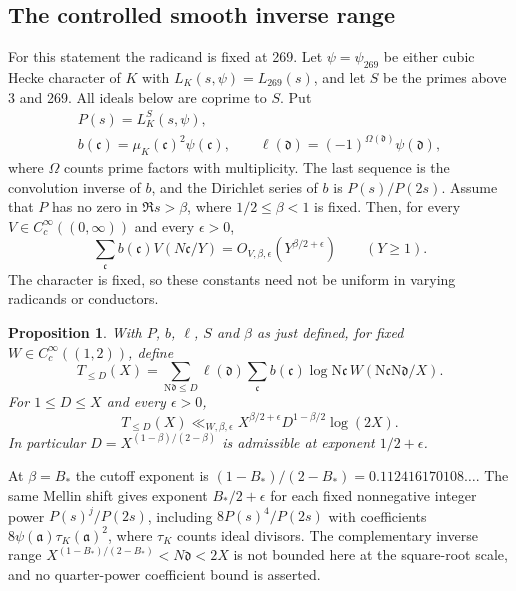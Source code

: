 \documentclass[11pt]{article}
\newtheorem{proposition}[theorem]{Proposition}
\newcommand{\N}{\mathrm N}
\begin{document}
\subsection*{The controlled smooth inverse range}
For this statement the radicand is fixed at 269. Let
$\psi=\psi_{269}$ be either cubic Hecke character of $K$ with
$L_K(s,\psi)=L_{269}(s)$, and let $S$ be the primes above 3 and 269.
All ideals below are coprime to $S$. Put
\[
 \begin{gathered}
 P(s)=L_K^S(s,\psi),\\
 b(\mathfrak c)=\mu_K(\mathfrak c)^2\psi(\mathfrak c),\qquad
 \ell(\mathfrak d)=(-1)^{\Omega(\mathfrak d)}\psi(\mathfrak d),
 \end{gathered}
\]
where $\Omega$ counts prime factors with multiplicity. The last
sequence is the convolution inverse of $b$, and the Dirichlet
series of $b$ is $P(s)/P(2s)$. Assume that $P$ has no zero in
$\Re s>\beta$, where $1/2\le\beta<1$ is fixed. Then, for every
$V\in C_c^\infty((0,\infty))$ and every $\epsilon>0$,
\[
 \sum_{\mathfrak c}b(\mathfrak c)V(N\mathfrak c/Y)
       =O_{V,\beta,\epsilon}(Y^{\beta/2+\epsilon})\qquad(Y\ge1).
\]
The character is fixed, so these constants need not be uniform
in varying radicands or conductors.
\begin{proposition}\label{prop:short}
With $P$, $b$, $\ell$, $S$ and $\beta$ as just defined,
for fixed $W\in C_c^\infty((1,2))$, define
\[
 T_{\le D}(X)=
 \sum_{\N\mathfrak d\le D}\ell(\mathfrak d)
 \sum_{\mathfrak c}b(\mathfrak c)\log\N\mathfrak c\,
          W(\N\mathfrak c\N\mathfrak d/X).
\]
For $1\le D\le X$ and every $\epsilon>0$,
\[
 T_{\le D}(X)\ll_{W,\beta,\epsilon}
       X^{\beta/2+\epsilon}D^{1-\beta/2}\log(2X).
                                                                    \tag{1.5}\label{eq:short-inverse-bound}
\]
In particular $D=X^{(1-\beta)/(2-\beta)}$ is admissible at exponent
$1/2+\epsilon$.
\end{proposition}

At $\beta=B_*$ the cutoff exponent is
$(1-B_*)/(2-B_*)=0.112416170108\ldots$.
The same Mellin shift gives exponent $B_*/2+\epsilon$ for each
fixed nonnegative integer power $P(s)^j/P(2s)$, including
$8P(s)^4/P(2s)$ with coefficients
$8\psi(\mathfrak a)\tau_K(\mathfrak a)^2$, where $\tau_K$ counts
ideal divisors.
The complementary inverse range
$X^{(1-B_*)/(2-B_*)}<N\mathfrak d<2X$ is not bounded here at
the square-root scale, and no quarter-power coefficient bound
is asserted.
\end{document}
